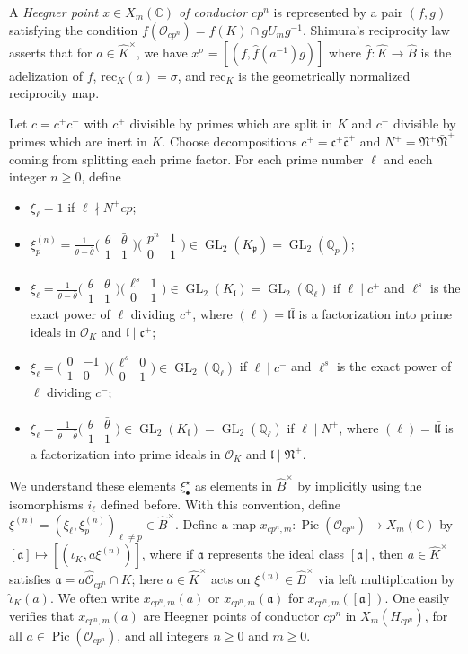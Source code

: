 \documentclass[a4paper,11pt]{amsart}
\numberwithin{equation}{section}
\theoremstyle{plain}
\theoremstyle{definition}
\theoremstyle{remark}
\newcommand{\Q}{\mathbb Q}
\newcommand{\C}{\mathbb C}
\DeclareMathOperator{\Pic}{Pic}
\DeclareMathOperator{\GL}{GL}
\newcommand{\smallmat}[4]{\bigl(\begin{smallmatrix}#1&#2\\#3&#4\end{smallmatrix}\bigr)}
\begin{document}
A \emph{Heegner point $x\in X_m(\C)$ of conductor $cp^n$} is represented by a pair $(f,g)$ 
satisfying the condition $f(\mathcal{O}_{cp^n})=f(K)\cap gU_mg^{-1}$. Shimura's reciprocity law asserts that for $a\in\widehat{K}^\times$, 
we have 
$x^\sigma=[(f,\hat{f}(a^{-1})g)]$
where $\hat{f}\colon\widehat{K}\rightarrow\widehat{B}$ is the adelization of $f$,
$\mathrm{rec}_K(a)=\sigma$, and $\mathrm{rec}_K$ is the geometrically normalized reciprocity map.

Let $c=c^+c^-$ with $c^+$ divisible by primes which are split in $K$ and $c^-$ divisible by primes which are inert in $K$. Choose decompositions  $c^+=\mathfrak{c}^+\bar{\mathfrak{c}}^+$ and 
$N^+=\mathfrak{N}^+\bar{\mathfrak{N}}^+$ coming from splitting each prime factor. 
For each prime number $\ell$ and each integer $n\geq 0$, define 
\begin{itemize}
      \item $\xi_\ell=1$ if $\ell\nmid N^+cp$;
           \item $\xi_{p}^{(n)}=\frac{1}{\theta-\bar{\theta}}\smallmat{\theta}{\bar\theta}{1}{1}\smallmat{p^n}{1}{0}{1}
           \in \GL_2(K_\mathfrak{p})=\GL_2(\Q_p)$; 
        \item $\xi_{\ell}=\frac{1}{\theta-\bar{\theta}}\smallmat{\theta}{\bar\theta}{1}{1}\smallmat{\ell^s}{1}{0}{1}\in \GL_2(K_\mathfrak{l})=\GL_2(\Q_\ell)$ if $\ell\mid c^+$ and $\ell^s$ is the exact power of $\ell$ dividing $c^+$, 
        where $(\ell)=\mathfrak{l}\bar{\mathfrak{l}}$ is a factorization into prime ideals in $\mathcal{O}_K$ and $\mathfrak{l}\mid \mathfrak{c}^+$; 
       \item $\xi_{\ell}=\smallmat{0}{-1}{1}{0}\smallmat{\ell^s}{0}{0}{1}\in \GL_2(\Q_\ell)$ if $\ell\mid c^-$ and $\ell^s$ is the exact power of $\ell$ dividing $c^-$;
         \item $\xi_\ell=\frac{1}{\theta-\bar{\theta}}\smallmat{\theta}{\bar\theta}{1}{1}\in \GL_2(K_\mathfrak{l})=\GL_2(\Q_\ell)$ if $\ell\mid N^+$, where $(\ell)=\mathfrak{l}\bar{\mathfrak{l}}$ is a factorization into prime ideals in $\mathcal{O}_K$ and $\mathfrak{l}\mid \mathfrak{N}^+$.
  \end{itemize}
We understand these elements $\xi^\star_\bullet$ as elements in $\widehat{B}^\times$ by implicitly using the isomorphisms $i_\ell$ defined before. 
With this convention, define $\xi^{(n)}=(\xi_\ell,\xi_{p}^{(n)})_{\ell\neq p}\in \widehat{B}^\times$.  
Define a map $x_{cp^n,m}\colon\Pic(\mathcal{O}_{cp^n})\rightarrow {X}_m(\C)$ by $[\mathfrak{a}]\mapsto[(\iota_K,a\xi^{(n)})]$,  
where
if $\mathfrak{a}$ represents the ideal class $[\mathfrak{a}]$, then $a\in \widehat{K}^\times$ satisfies $\mathfrak{a}=a\widehat{\mathcal{O}}_{cp^n}\cap K$; here $a \in \widehat{K}^\times$ acts on $\xi^{(n)}\in \widehat{B}^\times$ via left multiplication by $\hat{\iota}_K(a)$. We often write $x_{cp^n,m}(a)$ or $x_{cp^n,m}(\mathfrak{a})$ 
for $x_{cp^n,m}([\mathfrak{a}])$.
One easily verifies that $x_{cp^n,m}(a)$ are Heegner points of conductor $cp^n$ in $X_m(H_{cp^n})$, for all 
$a\in\Pic(\mathcal{O}_{cp^n})$, and all integers $n\geq 0$ and $m\geq0$.
\end{document}
